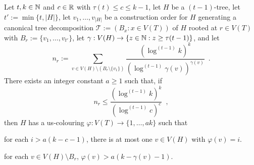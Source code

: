 \documentclass[kpfonts]{patmorin}
\theoremstyle{named}
\begin{document}
\begin{lem}\label{t-tree-no-slack}
    Let $t,k\in\mathbb{N}$ and $c\in\mathbb{R}$  with $\tau(t)\le c\le k-1$, let $H$ be a $(t-1)$-tree, let $t':=\min\{t, |H|\}$, let $v_1,\ldots,v_{|H|}$ be a construction order for $H$ generating a canonical tree decomposition $\mathcal{T}:=(B_x:x\in V(T))$ of $H$ rooted at $r\in V(T)$ with $B_r:=\{v_1,\ldots,v_{t'}\}$, let $\gamma:V(H)\to\{z\in\mathbb{N}: z\ge \tau(t-1)\}$, and let
    \[
        n_r:=\sum_{v\in V(H)\setminus (B_r\setminus\{v_1\})} \frac{(\log^{(t-1)} k)^k}{(\log^{(t-1)} \gamma(v))^{\gamma(v)}} \enspace .
    \]
    There exists an integer constant $a\ge 1$ such that,
    if
    \begin{equation}
         n_r \le \frac{(\log^{(t-1)} k)^k}{(\log^{(t-1)} c)^{c}} \enspace ,
     \label{total-weight-ii}
    \end{equation}
    then $H$ has a us-colouring $\varphi:V(T)\to\{1,\ldots,ak\}$ such that
    \begin{compactenum}[(P1)]
        \item for each $i>a(k-c-1)$, there is at most one $v\in V(H)$ with $\varphi(v)=i$.
        \item for each $v\in V(H)\setminus B_r$, $\varphi(v)> a(k-\gamma(v)-1)$.
    \end{compactenum}
\end{lem}
\end{document}
